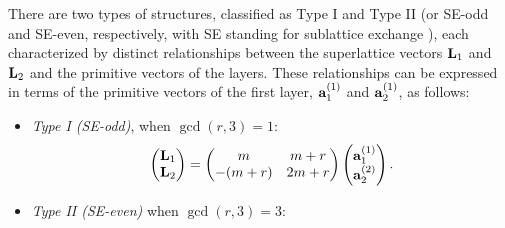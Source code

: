 There are two types of structures, classified as Type I and Type II \cite{zou2018} (or SE-odd and SE-even, respectively, with SE standing for sublattice exchange \cite{continuum_model_lopesdossantos2012}), each characterized by distinct relationships between the superlattice vectors \(\vb{L}_1\) and \(\vb{L}_2\) and the primitive vectors of the layers. These relationships can be expressed in terms of the primitive vectors of the first layer, \({\vb{a}}_1^{(1)}\) and \({\vb{a}}_2^{(1)}\), as follows:
\begin{itemize}

\item \textit{Type I (SE-odd)}, when $\gcd(r, 3) = 1$:
\begin{equation} \label{eq:type-I-L1L2}
\begin{pmatrix}
\vb{L}_1 \\ \vb{L}_2
\end{pmatrix} =
\begin{pmatrix}
m & m+r \\
-(m+r) & 2m+r
\end{pmatrix}
\begin{pmatrix}
{\vb{a}}_1^{(1)} \\ {\vb{a}}_2^{(2)}
\end{pmatrix}.
\end{equation}

\item \textit{Type II (SE-even)} when $\gcd(r,3) = 3$:


\end{itemize}
